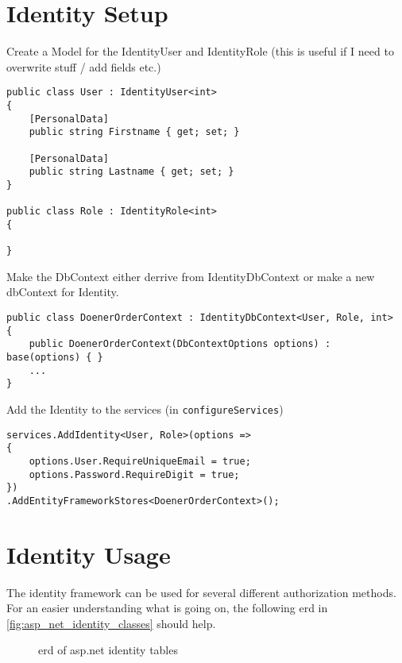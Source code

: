 \documentclass[12pt, a4paper, parskip=half]{scrreprt}
\begin{document}
\section{Identity Setup}
Create a Model for the IdentityUser and IdentityRole (this is useful if I need to overwrite stuff / add fields etc.)
\begin{lstlisting}
public class User : IdentityUser<int>
{
	[PersonalData]
	public string Firstname { get; set; }
	
	[PersonalData]
	public string Lastname { get; set; }
}

public class Role : IdentityRole<int>
{

}
\end{lstlisting}

Make the DbContext either derrive from IdentityDbContext or make a new dbContext for Identity.

\begin{lstlisting}
public class DoenerOrderContext : IdentityDbContext<User, Role, int>
{
	public DoenerOrderContext(DbContextOptions options) : base(options) { }
	...
}
\end{lstlisting}

Add the Identity to the services (in \lstinline|configureServices|)

\begin{lstlisting}
services.AddIdentity<User, Role>(options =>
{
	options.User.RequireUniqueEmail = true;
	options.Password.RequireDigit = true;
})
.AddEntityFrameworkStores<DoenerOrderContext>();
\end{lstlisting}

\section{Identity Usage}
The identity framework can be used for several different authorization methods. 
For an easier understanding what is going on, the following erd in \autoref{fig:asp_net_identity_classes} should help.
\begin{figure}
	\centering
{}	
\caption{erd of asp.net identity tables}
\label{fig:asp_net_identity_classes}
\end{figure}
\end{document}

